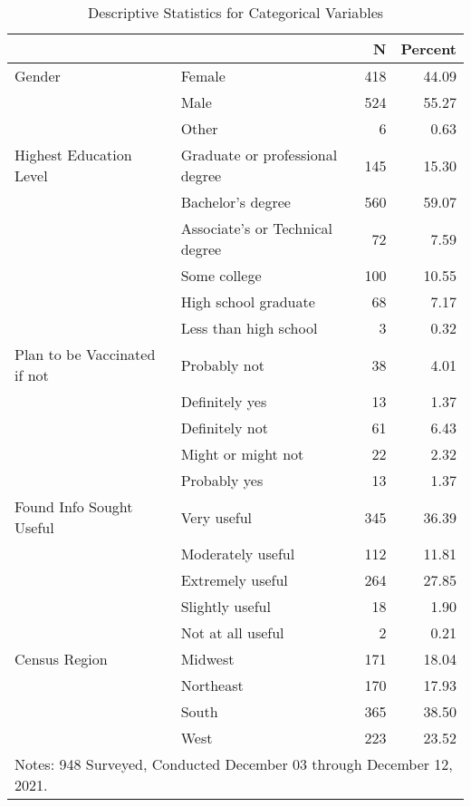 \begin{table}[ht]

\caption{\label{tab:table-2-desc}Descriptive Statistics for Categorical Variables}
\centering
\begin{tabular}{llrr}
\toprule
  &    & N & Percent\\
\midrule
Gender & Female & 418 & \num{44.09}\\
 & Male & 524 & \num{55.27}\\
 & Other & 6 & \num{0.63}\\
Highest Education Level & Graduate or professional degree & 145 & \num{15.30}\\
 & Bachelor's degree & 560 & \num{59.07}\\
 & Associate's or Technical degree & 72 & \num{7.59}\\
 & Some college & 100 & \num{10.55}\\
 & High school graduate & 68 & \num{7.17}\\
 & Less than high school & 3 & \num{0.32}\\
Plan to be Vaccinated if not & Probably not & 38 & \num{4.01}\\
 & Definitely yes & 13 & \num{1.37}\\
 & Definitely not & 61 & \num{6.43}\\
 & Might or might not & 22 & \num{2.32}\\
 & Probably yes & 13 & \num{1.37}\\
Found Info Sought Useful & Very useful & 345 & \num{36.39}\\
 & Moderately useful & 112 & \num{11.81}\\
 & Extremely useful & 264 & \num{27.85}\\
 & Slightly useful & 18 & \num{1.90}\\
 & Not at all useful & 2 & \num{0.21}\\
Census Region & Midwest & 171 & \num{18.04}\\
 & Northeast & 170 & \num{17.93}\\
 & South & 365 & \num{38.50}\\
 & West & 223 & \num{23.52}\\
\bottomrule
\multicolumn{4}{l}{\rule{0pt}{1em}Notes: 948 Surveyed, Conducted December 03 through December 12, 2021.}\\
\end{tabular}
\end{table}